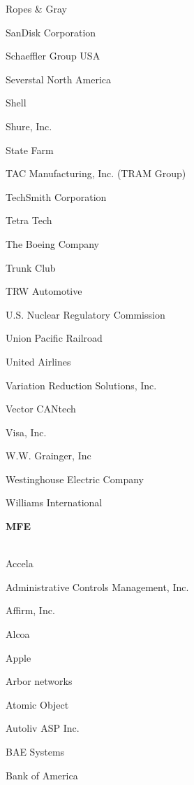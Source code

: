 \documentclass[twoside]{article}
\begin{document}
\begin{center}
\begin{multicols}{5}
\begin{FlushLeft}
\begin{compactitem}
\item Ropes \& Gray
\item SanDisk Corporation
\item Schaeffler Group USA
\item Severstal North America
\item Shell
\item Shure, Inc.
\item State Farm
\item TAC Manufacturing, Inc. (TRAM Group)
\item TechSmith Corporation
\item Tetra Tech
\item The Boeing Company
\item Trunk Club
\item TRW Automotive
\item U.S. Nuclear Regulatory Commission
\item Union Pacific Railroad
\item United Airlines
\item Variation Reduction Solutions, Inc.
\item Vector CANtech
\item Visa, Inc.
\item W.W. Grainger, Inc
\item Westinghouse Electric Company
\item Williams International
\end{compactitem}
        \end{FlushLeft}
        \vspace{1em}
        {\fontsize{14}{16}\selectfont \bf MFE}\\
        \vspace{-1em}
        ~\hrulefill~
        \vspace{-.9em}
        \begin{FlushLeft}
        \begin{compactitem}
        \item Accela
\item Administrative Controls Management, Inc.
\item Affirm, Inc.
\item Alcoa
\item Apple
\item Arbor networks
\item Atomic Object
\item Autoliv ASP Inc.
\item BAE Systems
\item Bank of America

\end{compactitem}
\end{FlushLeft}
\end{multicols}
\end{center}
\end{document}

